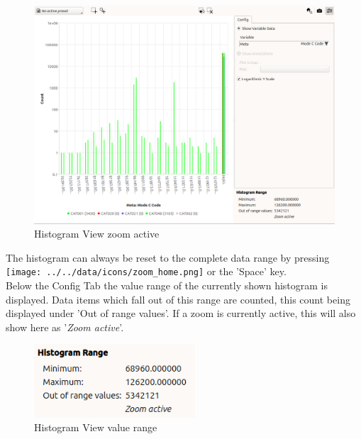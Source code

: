 \begin{figure}[H]
    \hspace*{-2cm}
    \includegraphics[width=18cm,frame]{figures/histogram_zoomed.png}
  \caption{Histogram View zoom active}
\end{figure}

The histogram can always be reset to the complete data range by pressing \texttt{[image: ../../data/icons/zoom\_home.png]} or the 'Space' key. \\

Below the Config Tab the value range of the currently shown histogram is displayed. 
Data items which fall out of this range are counted, this count being displayed under 'Out of range values'.
If a zoom is currently active, this will also show here as '\textit{Zoom active}'.

\begin{figure}[H]
    \center
    \includegraphics[width=6cm,frame]{figures/histogram_zoom_active.png}
  \caption{Histogram View value range}
\end{figure}

